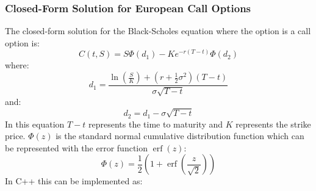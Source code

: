 \documentclass[12pt]{article}
\numberwithin{equation}{section}
\begin{document}
 \subsubsection{Closed-Form Solution for European Call Options}
 The closed-form solution for the Black-Scholes equation where the option is a call option is:
 \begin{equation}
 	C(t,S) = S\Phi(d_1) - Ke^{-r(T-t)}\Phi(d_2)
 	\label{eq:2.2}
 \end{equation}
 where: 
 \begin{equation*}
 	d_1 = \frac{\ln(\frac{S}{K}) + (r + \frac{1}{2}\sigma^2)(T-t)}{\sigma\sqrt{T-t}}
 \end{equation*}
  and:
  \begin{equation*}
  	d_2 = d_1 - \sigma\sqrt{T-t}
  \end{equation*}
  In this equation $T-t$ represents the time to maturity and $K$ represents the strike price. \newline \newline
  $\Phi(z)$ is the standard normal cumulative distribution function which can be represented with the error function $\operatorname{erf}(z)$: 
  \begin{equation}
  	\Phi(z) = \frac{1}{2}(1 + \operatorname{erf}(\frac{z}{\sqrt{2}}))
  	\label{eq:2.3}
  \end{equation}
 \newline In C++ this can be implemented as:
  
\end{document}

